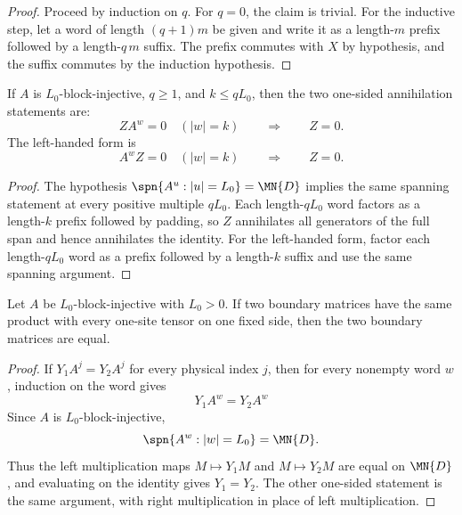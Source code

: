 \begin{proof}
    \leanok
    Proceed by induction on $q$. For $q=0$, the claim is trivial. For the
    inductive step, let a word of length $(q+1)m$ be given and write it as a
    length-$m$ prefix followed by a length-$q\,m$ suffix. The prefix commutes with
    $X$ by hypothesis, and the suffix commutes by the induction hypothesis.
\end{proof}

\begin{lemma}
    \label{lem:padded_complement_annihilation}
    \leanok
    If $A$ is $L_0$-block-injective, $q \ge 1$, and \(k \le qL_0\), then the
    two one-sided annihilation statements are:
    \[
        Z A^w = 0 \quad (|w|=k) \qquad\Longrightarrow\qquad Z=0.
    \]
    The left-handed form is
    \[
        A^w Z = 0 \quad (|w|=k) \qquad\Longrightarrow\qquad Z=0.
    \]
\end{lemma}

\begin{proof}
    \leanok
    The hypothesis $\spn\{A^u: |u|=L_0\}=\MN{D}$ implies the same spanning
    statement at every positive multiple $qL_0$. Each length-$qL_0$ word factors
    as a length-$k$ prefix followed by padding, so $Z$ annihilates all generators
    of the full span and hence annihilates the identity.
    For the left-handed form, factor each length-$qL_0$ word as a prefix followed
    by a length-$k$ suffix and use the same spanning argument.
\end{proof}

\begin{lemma}
    \label{lem:one_sided_boundary_witness_unique}
    \leanok
    Let $A$ be $L_0$-block-injective with $L_0>0$.  If two boundary matrices
    have the same product with every one-site tensor on one fixed side, then the
    two boundary matrices are equal.
\end{lemma}

\begin{proof}
    \leanok
    If $Y_1 A^j = Y_2 A^j$ for every physical index $j$, then for every
    nonempty word $w$, induction on the word gives
    \[
        Y_1 A^w = Y_2 A^w
    \]
    Since $A$ is $L_0$-block-injective,
    \[
        \spn\{A^w : |w|=L_0\}=\MN{D}.
    \]
    Thus the left multiplication maps $M\mapsto Y_1 M$ and
    $M\mapsto Y_2 M$ are equal on $\MN{D}$, and evaluating on the identity
    gives $Y_1=Y_2$.  The other one-sided statement is the same argument, with
    right multiplication in place of left multiplication.
\end{proof}

